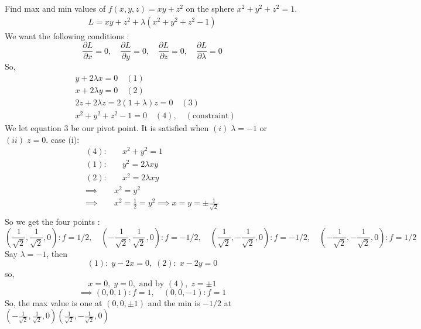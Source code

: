 \documentclass[12pt]{book}
\theoremstyle{definition}
\theoremstyle{remark}
\begin{document}
\begin{example}Find max and min values of $f(x,y,z) = xy + z^2$ on the sphere $x^2+ y^2 + z^2 = 1$. 
      \begin{equation*}
        \begin{split}
          L = xy+z^2+ \lambda (x^2 + y^2 + z^2 -1)
        \end{split}
      \end{equation*}
      We want the following conditions : 
      $$\frac{\partial {L}}{\partial {x}}= 0, \quad \frac{\partial {L}}{\partial {y}} = 0 , \quad \frac{\partial {L}}{\partial {z}} = 0, \quad \frac{\partial {L}}{\partial {\lambda}}= 0 $$
      So, 
      \begin{equation*}
        \begin{split}
          &y+ 2\lambda x = 0 \quad (1)\\ 
          &x+ 2 \lambda y = 0 \quad (2)\\ 
          &2z + 2 \lambda z= 2(1 + \lambda)z = 0 \quad (3)\\ 
          &x^2 + y^2 + z^2 - 1 = 0 \quad (4), \quad (\text{constraint})
        \end{split}
      \end{equation*}
      We let equation 3 be our pivot point. It is satisfied when $(i) \; \lambda = -1$ or $(ii) \; z = 0$. 
      \newline case (i):
      \begin{equation*}
        \begin{split}
          (4):& \quad x^2 + y^2 = 1 \\ 
          (1):& \quad y^2 = 2\lambda xy \\ 
          (2):& \quad x^2 = 2\lambda xy \\
          \implies& x^2 = y^2 \\ 
          \implies& x^2 = \frac{1}{2} = y^2 \implies x= y = \pm \frac{1}{\sqrt{2}} \\ 
        \end{split}
      \end{equation*}
      So we get the four points : $$(\frac{1}{\sqrt{2}}, \frac{1}{\sqrt{2}}, 0) : f= 1/2, \quad (-\frac{1}{\sqrt{2}}, \frac{1}{\sqrt{2}}, 0): f= -1/2, \quad (\frac{1}{\sqrt{2}}, -\frac{1}{\sqrt{2}}, 0): f= -1/2, \quad (-\frac{1}{\sqrt{2}}, -\frac{1}{\sqrt{2}}, 0): f= 1/2  $$
      Say $\lambda = -1$, then $$(1): \; y-2x = 0 , \; (2): \; x-2y = 0 $$
      so, $$x = 0, \; y=0 , \text{ and by }(4),\; z = \pm 1 $$
      $$\implies (0,0,1): f=1, \quad (0,0,-1): f=1 $$
      So, the max value is one at $(0,0, \pm 1)$ and the min is $-1/2$ at  $(-\frac{1}{\sqrt{2}}, \frac{1}{\sqrt{2}}, 0) (\frac{1}{\sqrt{2}}, -\frac{1}{\sqrt{2}}, 0)$
    \end{example}
\end{document}
